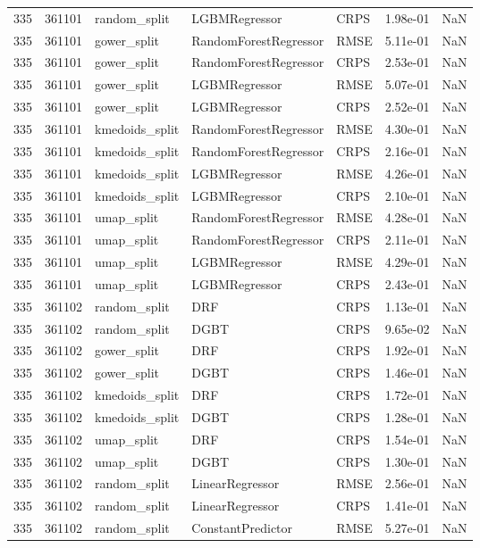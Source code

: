 \begin{tabular}{rrlllrr}
335 & 361101 & random\_split & LGBMRegressor & CRPS & 1.98e-01 & NaN \\
335 & 361101 & gower\_split & RandomForestRegressor & RMSE & 5.11e-01 & NaN \\
335 & 361101 & gower\_split & RandomForestRegressor & CRPS & 2.53e-01 & NaN \\
335 & 361101 & gower\_split & LGBMRegressor & RMSE & 5.07e-01 & NaN \\
335 & 361101 & gower\_split & LGBMRegressor & CRPS & 2.52e-01 & NaN \\
335 & 361101 & kmedoids\_split & RandomForestRegressor & RMSE & 4.30e-01 & NaN \\
335 & 361101 & kmedoids\_split & RandomForestRegressor & CRPS & 2.16e-01 & NaN \\
335 & 361101 & kmedoids\_split & LGBMRegressor & RMSE & 4.26e-01 & NaN \\
335 & 361101 & kmedoids\_split & LGBMRegressor & CRPS & 2.10e-01 & NaN \\
335 & 361101 & umap\_split & RandomForestRegressor & RMSE & 4.28e-01 & NaN \\
335 & 361101 & umap\_split & RandomForestRegressor & CRPS & 2.11e-01 & NaN \\
335 & 361101 & umap\_split & LGBMRegressor & RMSE & 4.29e-01 & NaN \\
335 & 361101 & umap\_split & LGBMRegressor & CRPS & 2.43e-01 & NaN \\
335 & 361102 & random\_split & DRF & CRPS & 1.13e-01 & NaN \\
335 & 361102 & random\_split & DGBT & CRPS & 9.65e-02 & NaN \\
335 & 361102 & gower\_split & DRF & CRPS & 1.92e-01 & NaN \\
335 & 361102 & gower\_split & DGBT & CRPS & 1.46e-01 & NaN \\
335 & 361102 & kmedoids\_split & DRF & CRPS & 1.72e-01 & NaN \\
335 & 361102 & kmedoids\_split & DGBT & CRPS & 1.28e-01 & NaN \\
335 & 361102 & umap\_split & DRF & CRPS & 1.54e-01 & NaN \\
335 & 361102 & umap\_split & DGBT & CRPS & 1.30e-01 & NaN \\
335 & 361102 & random\_split & LinearRegressor & RMSE & 2.56e-01 & NaN \\
335 & 361102 & random\_split & LinearRegressor & CRPS & 1.41e-01 & NaN \\
335 & 361102 & random\_split & ConstantPredictor & RMSE & 5.27e-01 & NaN \\

\end{tabular}
